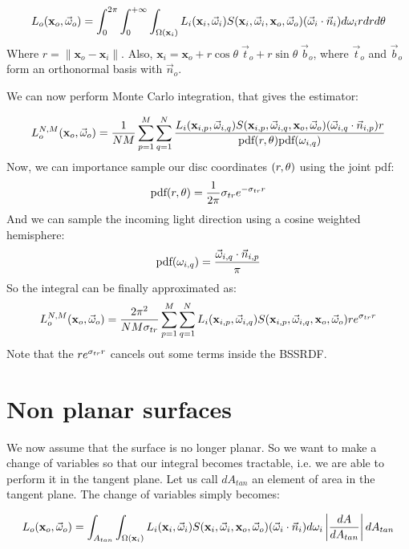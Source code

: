 \documentclass[10pt,a4paper]{article}
\begin{document}
\begin{equation*}
L_o(\mathbf{x}_o, \vec{\omega}_o) = \int_0^{2\pi} \int_0^{+\infty} \int_{\Omega(\mathbf{x}_i)} L_i(\mathbf{x}_i, \vec{\omega}_i) S(\mathbf{x}_i, \vec{\omega}_i, \mathbf{x}_o, \vec{\omega}_o) (\vec{\omega}_i \cdot \vec{n}_i) d\omega_i r dr d\theta
\end{equation*}
Where $r = \|\mathbf{x}_o-\mathbf{x}_i\|$. Also, $\mathbf{x}_i = \mathbf{x}_o + r \cos\theta\; \vec{t}_o + r \sin\theta\; \vec{b}_o$, where $\vec{t}_o$ and $\vec{b}_o$ form an orthonormal basis with $\vec{n}_o$.

We can now perform Monte Carlo integration, that gives the estimator:

\begin{equation*}
L_o^{N,M}(\mathbf{x}_o, \vec{\omega}_o) = \frac{1}{NM}\sum_{p=1}^M \sum_{q=1}^N \frac{L_i(\mathbf{x}_{i,p}, \vec{\omega}_{i,q}) S(\mathbf{x}_{i,p}, \vec{\omega}_{i,q}, \mathbf{x}_o, \vec{\omega}_o) (\vec{\omega}_{i,q} \cdot \vec{n}_{i,p}) r }{\text{pdf}(r,\theta) \text{pdf}(\omega_{i,q})}
\end{equation*}
Now, we can importance sample our disc coordinates $(r,\theta)$ using the joint pdf:
$$
\text{pdf}(r,\theta) = \frac{1}{2 \pi} \sigma_{tr} e^{-\sigma_{tr} r} 
$$
And we can sample the incoming light direction using a cosine weighted hemisphere:
$$
\text{pdf}(\omega_{i,q}) = \frac{\vec{\omega}_{i,q} \cdot \vec{n}_{i,p}}{\pi} 
$$
So the integral can be finally approximated as:
$$
L_o^{N,M}(\mathbf{x}_o, \vec{\omega}_o) = \frac{2 \pi^2}{NM \sigma_{tr}}\sum_{p=1}^M \sum_{q=1}^N L_i(\mathbf{x}_{i,p}, \vec{\omega}_{i,q}) S(\mathbf{x}_{i,p}, \vec{\omega}_{i,q}, \mathbf{x}_o, \vec{\omega}_o) r e^{\sigma_{tr} r}   
$$
Note that the  $r e^{\sigma_{tr} r} $ cancels out some terms inside the BSSRDF. 
\section{Non planar surfaces}
We now assume that the surface is no longer planar. So we want to make a change of variables so that our integral becomes tractable, i.e. we are able to perform it in the tangent plane. Let us call $dA_{tan}$ an element of area in the tangent plane. The change of variables simply becomes:

\begin{equation*}
L_o(\mathbf{x}_o, \vec{\omega}_o) = \int_{A_{tan}} \int_{\Omega(\mathbf{x}_i)} L_i(\mathbf{x}_i, \vec{\omega}_i) S(\mathbf{x}_i, \vec{\omega}_i, \mathbf{x}_o, \vec{\omega}_o) (\vec{\omega}_i \cdot \vec{n}_i) d\omega_i \left|\frac{dA}{dA_{tan}} \right| dA_{tan}
\end{equation*}
\end{document}
